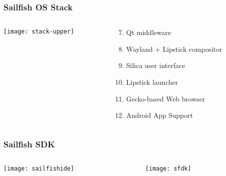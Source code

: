 \documentclass[
	notes=none,
	aspectratio=169
]{beamer}
\begin{document}
\begin{frame}
\frametitle{Sailfish OS Stack}

\begin{columns}[T]
\begin{column}[T]{0.5\textwidth}
\setlength{\parskip}{0.5em}

\vspace{0.0cm}
\hspace{1.3cm}
\texttt{[image: stack-upper]}

\end{column}
\begin{column}[T]{0.5\textwidth}
\setlength{\parskip}{0.5em}

\vspace{1.5cm}
\begin{enumerate}
\setcounter{enumi}{6}
\setlength{\parskip}{0.5em}
\item Qt middleware
\item Wayland + Lipstick compositor
\item Silica user interface
\item Lipstick launcher
\item Gecko-based Web browser
\item Android App Support
\end{enumerate}

\end{column}
\end{columns}

\end{frame}
\note{
}


\begin{frame}
\frametitle{Sailfish SDK}

\begin{columns}[T]
\begin{column}[T]{0.5\textwidth}
\setlength{\parskip}{0.5em}

\vspace{0.3cm}
\hspace{0.1cm}
\texttt{[image: sailfishide]}

\end{column}
\begin{column}[T]{0.5\textwidth}
\setlength{\parskip}{0.5em}

\vspace{0.3cm}
\texttt{[image: sfdk]}

\end{column}
\end{columns}

\end{frame}
\note{
}
\end{document}
